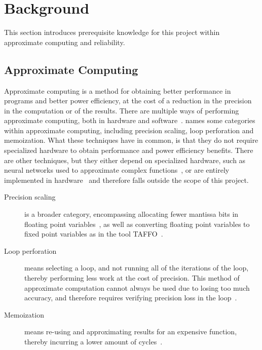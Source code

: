 \section{Background}
\label{sec:background}
This section introduces prerequisite knowledge for this project within approximate computing and reliability.

\subsection{Approximate Computing}

Approximate computing is a method for obtaining better performance in programs and better power efficiency, at the cost of a reduction in the precision in the computation or of the results. There are multiple ways of performing approximate computing, both in hardware and 
software~\citep{han2013approximate}.
\citet{mittal2016survey} names some categories within approximate computing, including precision scaling, loop perforation and memoization. What these techniques have in common, is that they do not require specialized hardware to obtain performance and power efficiency benefits. There are other techniques, but they either depend on specialized hardware, such as neural networks used to approximate complex functions~\citep{mittal2016survey}, or are entirely implemented in hardware~\citep{han2013approximate} and therefore falls outside the scope of this project.

\begin{description}
\item[Precision scaling] is a broader category, encompassing allocating fewer mantissa bits in floating point variables~\citep{tagliavini2018flexfloat}, as well as converting floating point variables to fixed point variables as in the tool TAFFO~\citep{cherubin2019taffo}. 

\item[Loop perforation] means selecting a loop, and not running all of the iterations of the loop, thereby performing less work at the cost of precision. This method of approximate computation cannot always be used due to losing too much accuracy, and therefore requires verifying precision loss in the loop~\citep{li2018sculptor}. 

\item[Memoization] means re-using and approximating results for an expensive function, thereby incurring a lower amount of cycles~\citep{mittal2016survey}. 
\end{description}

